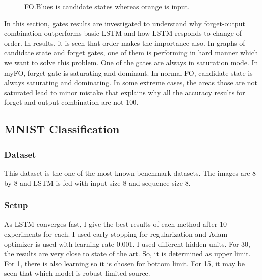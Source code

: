 \documentclass[12pt, letterpaper]{article}
\begin{document}
\begin{figure}[H]
\begin{subfigure}[b]{0.3\textwidth}
        \label{fig:mouse}
    \end{subfigure}
    \caption{FO.Blues is candidate states whereas orange is input.}\label{fig:animals}
\end{figure}



	In this section, gates results are investigated to understand why forget-output combination outperforms basic LSTM and how LSTM responds to change of order. In results, it is seen that order makes the importance also. In graphs of candidate state and forget gates, one of them is performing in hard manner which we want to solve this problem. One of the gates are always in saturation mode. In myFO, forget gate is saturating and dominant. In normal FO, candidate state is always saturating and dominating. In some extreme cases, the areas those are not saturated lead to minor mistake that explains why all the accuracy results for forget and output combination are not 100.
	
\newpage
\subsection{MNIST Classification}
\subsubsection{Dataset}
	This dataset is the one of the most known benchmark datasets. The images are 8 by 8 and LSTM is fed with input size 8 and sequence size 8.
\subsubsection{Setup}
	As LSTM converges fast, I give the best results of each method after 10 experiments for each. I used early stopping for regularization and Adam optimizer is used with learning rate 0.001.
I used different hidden units. For 30, the results are very close to state of the art. So, it is determined as upper limit. For 1, there is also learning so it is chosen for bottom limit. For 15, it may be seen that which model is robust limited source.
\end{document}
